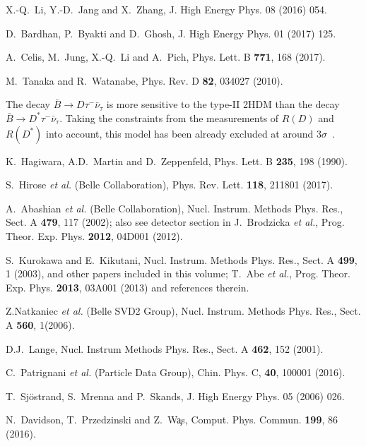 \documentclass[aps,prd,twocolumn,superscriptaddress,showpacs,preprintnumbers,amsmath,amssymb]{revtex4-1}
\begin{document}
\begin{thebibliography}{99}
  X.-Q.~Li, Y.-D.~Jang and X.~Zhang,
  J. High Energy Phys. 08 (2016) 054.
  
  D.~Bardhan, P.~Byakti and D.~Ghosh,
  J. High Energy Phys. 01 (2017) 125.

  A.~Celis, M.~Jung, X.-Q.~Li and A.~Pich,
  Phys. Lett. B {\bf 771}, 168 (2017).
  
  M.~Tanaka and R.~Watanabe,
  Phys. Rev. D {\bf 82}, 034027 (2010).  

  The decay $\bar{B} \rightarrow D \tau^- \bar{\nu}_\tau$ is more sensitive to the type-II 2HDM than the decay $\bar{B} \rightarrow D^* \tau^- \bar{\nu}_\tau$. Taking the constraints from the measurements of $R(D)$ and $R(D^*)$ into account, this model has been already excluded at around 3$\sigma$~\cite{cite:BaBar:2012:letter}.

  K.~Hagiwara, A.D.~Martin and D.~Zeppenfeld,
  Phys. Lett. B {\bf 235}, 198 (1990).
  
  S.~Hirose {\it et al.} (Belle Collaboration),
  Phys. Rev. Lett. {\bf 118}, 211801 (2017).

  A.~Abashian {\it et al.} (Belle Collaboration),
  Nucl. Instrum. Methods Phys. Res., Sect. A {\bf 479}, 117 (2002); also see detector section in J.~Brodzicka {\it et al.}, Prog. Theor. Exp. Phys. {\bf 2012}, 04D001 (2012).
  
  S.~Kurokawa and E.~Kikutani, Nucl. Instrum. Methods Phys. Res., Sect. A {\bf 499}, 1 (2003),
  and other papers included in this volume; T.~Abe {\it et al.}, Prog. Theor. Exp. Phys. {\bf 2013}, 03A001 (2013) and references therein.

  Z.Natkaniec {\it et al.} (Belle SVD2 Group), Nucl. Instrum. Methods Phys. Res., Sect. A {\bf 560}, 1(2006).
  
  D.J.~Lange,
  Nucl. Instrum Methods Phys. Res., Sect. A {\bf 462}, 152 (2001).

  C.~Patrignani {\it et al.} (Particle Data Group),
  Chin. Phys. C, {\bf 40}, 100001 (2016).

  T.~Sj\"ostrand, S.~Mrenna and P.~Skands,
  J. High Energy Phys. 05 (2006) 026.

  N.~Davidson, T.~Przedzinski and Z.~W\c{a}s,
  Comput. Phys. Commun. {\bf 199}, 86 (2016).
  

\end{thebibliography}
\end{document}
